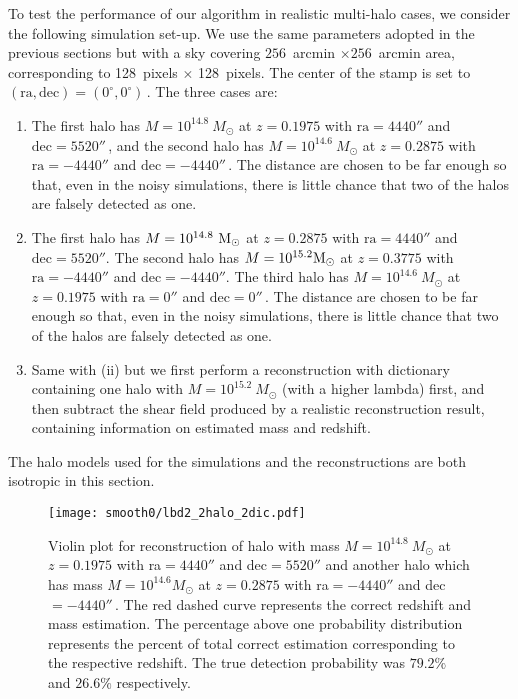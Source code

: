 \documentclass[twocolumn, usenames, dvipsnames]{aastex63}
\begin{document}
To test the performance of our algorithm in realistic multi-halo cases, we
consider the following simulation set-up. We use the same parameters adopted in
the previous sections but with a sky covering $256$~arcmin $\times256$~arcmin
area, corresponding to 128~pixels $\times$ 128~pixels. The center of the stamp
is set to $(\text{ra}, \text{dec})=(0^\circ, 0^\circ)$\,. The three cases are:
\begin{enumerate}
    \item The first halo has $M=10^{14.8}~M_\odot$ at $z=0.1975$ with
        $\text{ra}=4440''$ and $\text{dec}=5520''\,$, and the second halo has
        $M=10^{14.6}~{M}_\odot$ at $z=0.2875$ with $\text{ra}=-4440''$ and
        $\text{dec}=-4440''$\,. The distance are chosen to be far enough so
        that, even in the noisy simulations, there is little chance that two of
        the halos are falsely detected as one.
    \item The first halo has $M=10^{14.8}~\textup{M}_\odot$ at $z=0.2875$ with
        $\text{ra} = 4440''$ and $\text{dec} = 5520''$. The second halo has
        $M=10^{15.2}\textup{M}_\odot$ at $z= 0.3775$ with $\text{ra} = -4440''$
        and $\text{dec} = -4440''$. The third halo has $M=10^{14.6}~M_\odot$ at
        $z= 0.1975$ with $\text{ra} = 0''$ and $\text{dec} = 0''$\,. The
        distance are chosen to be far enough so that, even in the noisy
        simulations, there is little chance that two of the halos are falsely
        detected as one.
    \item Same with (ii) but we first perform a reconstruction with dictionary
        containing one halo with $M = 10^{15.2}~M_\odot$ (with a higher lambda)
        first, and then subtract the shear field produced by a realistic
        reconstruction result, containing information on estimated mass and
        redshift.
\end{enumerate}
The halo models used for the simulations and the reconstructions are both
isotropic in this section.

\begin{figure*}
\begin{center}
    \texttt{[image: smooth0/lbd2\_2halo\_2dic.pdf]}
\end{center}
\caption{
    Violin plot for reconstruction of halo with mass
    $M=10^{14.8}~M_\odot$ at $z=0.1975$ with ra$= 4440''$ and dec$=
    5520''$ and another halo which has mass $M=10^{14.6}M_\odot$ at
    $z=0.2875$ with ra$=-4440''$ and dec$=-4440''$\,. The red dashed curve
    represents the correct redshift and mass estimation. The percentage above
    one probability distribution represents the percent of total correct
    estimation corresponding to the respective redshift. The true detection
    probability was $79.2\%$ and $26.6\%$ respectively.
    }
    \label{Noisy2Halo_lbd2}
\end{figure*}
\end{document}
